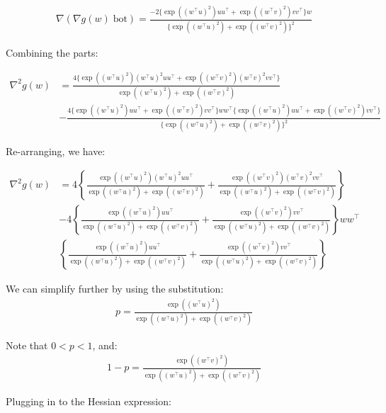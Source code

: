 \documentclass[11pt]{article}
\begin{document}
\begin{align*}
    \nabla (\nabla g(w) \; \textrm{bot}) = \frac{ -2 \{ \exp((w^{\top}u)^2)uu^{\top} + \exp((w^{\top}v)^2)vv^{\top} \} w }{ \{ \exp((w^{\top}u)^2) + \exp((w^{\top}v)^2) \}^2 }
\end{align*}

Combining the parts:

\begin{align*}
    \nabla^2 g(w) &= 
    \frac{ 4 \{ \exp((w^{\top}u)^2)(w^{\top}u)^2 uu^{\top} + \exp((w^{\top}v)^2)(w^{\top}v)^2 vv^{\top} \} }{ \exp((w^{\top}u)^2) + \exp((w^{\top}v)^2)  } \\
    &- \frac{ 4 \{ \exp((w^{\top}u)^2)uu^{\top} + \exp((w^{\top}v)^2)vv^{\top}  \} ww^{\top} \{ \exp((w^{\top}u)^2)uu^{\top} + \exp((w^{\top}v)^2)vv^{\top}  \} }{ \{ \exp((w^{\top}u)^2) + \exp((w^{\top}v)^2) \}^2 }
\end{align*}

Re-arranging, we have:

\begin{align*}
    \nabla^2 g(w) &= 
    4 \left\{ \frac{  \exp((w^{\top}u)^2)(w^{\top}u)^2 uu^{\top}  }{ \exp((w^{\top}u)^2) + \exp((w^{\top}v)^2)  } +
    \frac{  \exp((w^{\top}v)^2)(w^{\top}v)^2 vv^{\top}  }{ \exp((w^{\top}u)^2) + \exp((w^{\top}v)^2)  } \right\} \\
    &- 4 \left\{
    \frac{  \exp((w^{\top}u)^2) uu^{\top}  }{ \exp((w^{\top}u)^2) + \exp((w^{\top}v)^2)  } + \frac{  \exp((w^{\top}v)^2) vv^{\top}  }{ \exp((w^{\top}u)^2) + \exp((w^{\top}v)^2)  } \right\}
    ww^{\top} \\
     & \left\{ \frac{  \exp((w^{\top}u)^2) uu^{\top}  }{ \exp((w^{\top}u)^2) + \exp((w^{\top}v)^2)  } + \frac{  \exp((w^{\top}v)^2) vv^{\top}  }{ \exp((w^{\top}u)^2) + \exp((w^{\top}v)^2)  }
     \right\}
\end{align*}

We can simplify further by using the substitution: 
\begin{align*}
p = \frac{\exp((w^{\top}u)^2)}{ \exp((w^{\top}u)^2) + \exp((w^{\top}v)^2) }
\end{align*}

Note that $0 < p < 1$, and:
\begin{align*}
1 - p = \frac{\exp((w^{\top}v)^2)}{ \exp((w^{\top}u)^2) + \exp((w^{\top}v)^2) }
\end{align*}

Plugging in to the Hessian expression:
\end{document}
